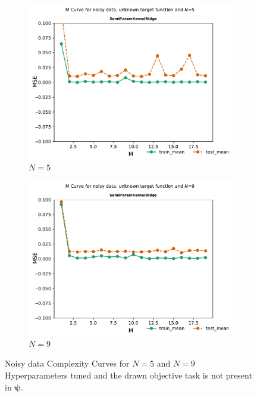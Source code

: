 \documentclass{tran-l}
\theoremstyle{definition}
\theoremstyle{remark}
\numberwithin{equation}{section}
\begin{document}
\begin{figure}[h!]
   \centering
   \begin{subfigure}[b]{0.45\textwidth}
     \centering
     \includegraphics[width=\textwidth]{Figures/unknownnoisy/Mcurve5}
     \caption{$N=5$}
   \end{subfigure}
   \hfill
   \begin{subfigure}[b]{0.45\textwidth}
     \centering
     \includegraphics[width=\textwidth]{Figures/unknownnoisy/Mcurve9}
     \caption{$N=9$}
   \end{subfigure}
   \caption{Noisy data Complexity Curves for $N=5$ and $N=9$ Hyperparameters tuned and the drawn objective task is not present in $\boldsymbol{\psi}$.}
\end{figure}
\end{document}
